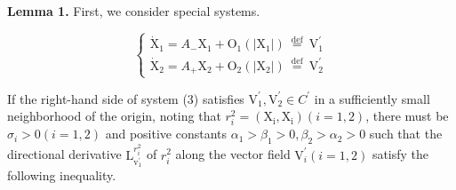 \documentclass[11pt]{diazessay} %
\begin{document}

\vskip 8pt
\textbf{Lemma 1.} First, we consider special systems.

\begin{equation}
	\left\{\begin{array}{l}
		\dot{\mathrm{X}}_{1}=A_{-} \mathrm{X}_{1}+\mathrm{O}_{1}\left(\left|\mathrm{X}_{1}\right|\right) \stackrel{\text { def }}{=} \mathrm{V}_{1}^{\prime} \\
		\dot{\mathrm{X}}_{2}=A_{+} \mathrm{X}_{2}+\mathrm{O}_{2}\left(\left|\mathrm{X}_{2}\right|\right) \stackrel{\text { def }}{=} \mathrm{V}_{2}^{\prime}
	\end{array}\right.
\end{equation}

\noindent
If the right-hand side of system (3) satisfies $\mathrm{V}_{1}^{\prime}, \mathrm{V}_{2}^{\prime} \in C^{\prime} $ in a sufficiently small neighborhood of the origin, noting that $r_{i}^{2}=\left(\mathrm{X}_{\mathrm{i}}\right. ,  \left.\mathrm{X}_{\mathrm{i}}\right)(i=1,2) $, 
there must be $\sigma_{i}>0(i=1,2)$ and positive constants $ \alpha_{1}>\beta_{1}>0,\beta_{2}>\alpha_{2}>0  $ such that the directional derivative $ \mathrm{L}_{\mathrm{v}_{1}^{\prime}}^{r_{i}^{2}} $ of $ r_{i}^{2}$ along the vector field $ \mathrm{V}_{i}^{\prime}(i=1,2) $ 
satisfy the following inequality.
\end{document}
